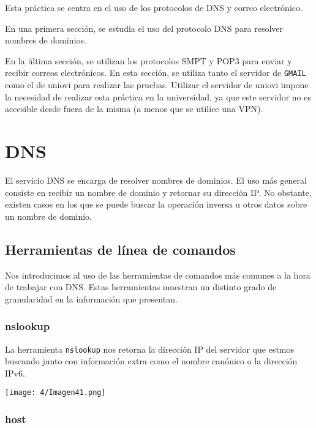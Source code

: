 
Esta práctica se centra en el uso de los protocolos de DNS y correo electrónico.

En una primera sección, se estudia el uso del protocolo DNS para resolver nombres de dominios.

En la última sección, se utilizan los protocolos SMPT y POP3 para enviar y recibir correos electrónicos.
En esta sección, se utiliza tanto el servidor de \verb#GMAIL# como el de uniovi para realizar las pruebas.
Utilizar el servidor de uniovi impone la necesidad de realizar esta práctica en la universidad,
ya que este servidor no es accesible desde fuera de la misma (a menos que se utilice una VPN).

\section{DNS}

El servicio DNS se encarga de resolver nombres de dominios.
El uso más general consiste en recibir un nombre de dominio y retornar su dirección IP.
No obstante, existen casos en los que se puede buscar la operación inversa u
otros datos sobre un nombre de dominio.

\subsection{Herramientas de línea de comandos}

Nos introducimos al uso de las herramientas de comandos más comunes a la hora de trabajar con DNS.
Estas herramientas muestran un distinto grado de granularidad en la información que presentan.

\subsubsection{nslookup}

La herramienta \verb#nslookup# nos retorna la dirección IP del servidor que estmos buscando
junto con información extra como el nombre canónico o la dirección IPv6.

\begin{minipage}{\linewidth}
	\centering
	\texttt{[image: 4/Imagen41.png]}
	\label{fig:4/1}
\end{minipage}

\subsubsection{host}

